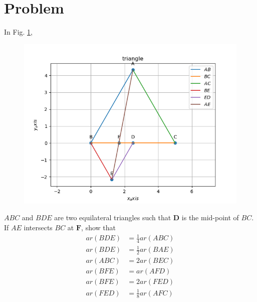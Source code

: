\documentclass[10pt, a4paper]{article}
\title{\mytitle}
\author{\myauthor\hspace{1em}\\\contact\\FWC22040\hspace{6.5em}IITH\hspace{0.5em}\mymodule\hspace{6em}ASSIGN-5}
\date{}
\let\vec\mathbf
\begin{document}
 \maketitle
 \tableofcontents
   \section{Problem}
   \fi
   In Fig. 
		\ref{fig:9/9/4/5},
	\begin{figure}[!h]
		\centering
 \includegraphics[width=\columnwidth]{chapters/9/9/4/5/figs/matrix.png}
		\caption{}
		\label{fig:9/9/4/5}
  	\end{figure}
$  ABC$ and $BDE$ are two equilateral
triangles such that $\vec{D}$ is the mid-point of $BC$. If $AE$
intersects $BC$ at $\vec{F}$, show that
\begin{align}
	ar(BDE) &=\frac{1}{4} ar(ABC)\\
	ar(BDE) &=\frac{1}{2} ar(BAE)\\
ar(ABC) &=2 ar(BEC)\\
ar(BFE) &= ar(AFD)\\
ar(BFE) &=2ar(FED)\\
	ar(FED) &=\frac{1}{8} ar(AFC)
\end{align}
\iffalse
\end{document}
